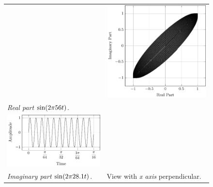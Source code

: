 \documentclass[../../course]{subfiles}
\begin{document}
\begin{figure} [H]
\begin{NiceTabularX} {\textwidth} {
            *{2}{>{\centering\arraybackslash}X}
        }
        &

         {
             {
                \includegraphics[height = \textheight] {tikzpics/plotFrontViewComplexH.pdf}
            }
        }

        \\

         {\emph{Real part} $\sin(2 \pi 56 t)$.}
        \label{plt:realCmplxH}

        &
        \\

         {
             {
                \includegraphics[height = \textheight] {tikzpics/plotShortX2.pdf}
            }
        }

        &
        \\

         {\emph{Imaginary part} $\sin(2 \pi 28.1 t)$.}
        \label{plt:imagCmplxH}

        &

         {View with \emph{x axis} perpendicular.}
        \label{plt:frontViewCmplxH}

        \\

    \end{NiceTabularX}

\end{figure}
\end{document}
